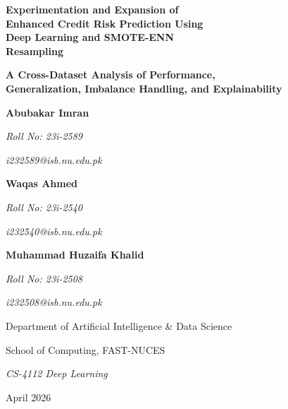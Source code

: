 \documentclass[11pt,a4paper]{article}
\begin{document}
\begin{titlepage}
\thispagestyle{empty}
\begin{center}

\vspace*{1.1cm}

{\fontsize{24}{30}\selectfont\bfseries
Experimentation and Expansion of\\
Enhanced Credit Risk Prediction Using\\
Deep Learning and SMOTE-ENN\\
Resampling\par}

\vspace{0.7cm}

{\fontsize{15}{20}\selectfont\bfseries
A Cross-Dataset Analysis of Performance,\\
Generalization, Imbalance Handling, and Explainability\par}

\vspace{2.2cm}

\noindent
\begin{minipage}[t]{0.44\textwidth}
\centering
{\Large\bfseries Abubakar Imran\par}
\vspace{0.15cm}
{\large\itshape Roll No: 23i-2589\par}
\vspace{0.15cm}
{\large\itshape i232589@isb.nu.edu.pk\par}
\end{minipage}
\hfill
\begin{minipage}[t]{0.44\textwidth}
\centering
{\Large\bfseries Waqas Ahmed\par}
\vspace{0.15cm}
{\large\itshape Roll No: 23i-2540\par}
\vspace{0.15cm}
{\large\itshape i232540@isb.nu.edu.pk\par}
\end{minipage}

\vspace{0.7cm}

{\Large\bfseries Muhammad Huzaifa Khalid\par}
\vspace{0.15cm}
{\large\itshape Roll No: 23i-2508\par}
\vspace{0.15cm}
{\large\itshape i232508@isb.nu.edu.pk\par}

\vfill

{\Large Department of Artificial Intelligence \& Data Science\par}
\vspace{0.15cm}
{\Large School of Computing, FAST-NUCES\par}
\vspace{0.15cm}
{\Large\itshape CS-4112 Deep Learning\par}
\vspace{0.15cm}
{\Large April 2026\par}

\end{center}
\end{titlepage}
\end{document}
